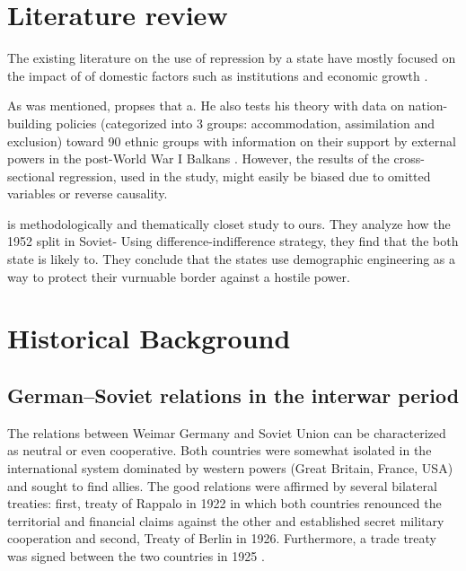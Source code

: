 \documentclass[12pt]{article}
\begin{document}






\section{Literature review}
The existing literature on the use of repression by a state have mostly focused on the impact of  of domestic factors such as institutions and economic growth \citep{davenport_state_2007, davenport_state_2007-1}.

As was mentioned, \citet{mylonas_politics_2013} propses that a. He also tests his theory with data on nation-building policies (categorized into 3 groups: accommodation, assimilation and exclusion)  toward  90 ethnic groups with information on their support by external powers in the post-World War I Balkans . However, the results of the cross-sectional regression, used in the study, might easily be biased due to omitted variables or reverse causality. 

 \citet{blaydes_state_2018} 

\citet{mcnamee_demographic_nodate} is methodologically and thematically closet study to ours. They analyze how the 1952 split in Soviet-
Using difference-indifference strategy, they find that the both state is likely to. They conclude that the states use demographic engineering as a way to protect their vurnuable border against a hostile power. 

\section{Historical Background}
\subsection{German–Soviet relations in the interwar period}
The relations between Weimar Germany and Soviet Union can be characterized as neutral or even cooperative. Both countries were somewhat isolated in the international system dominated by western powers (Great Britain, France, USA) and sought to find allies. The good relations were affirmed by several bilateral treaties: first, treaty of Rappalo in 1922 in which both countries renounced the territorial and financial claims against the other and established secret military cooperation and second, Treaty of Berlin in 1926. Furthermore, a trade treaty was signed between the two countries in 1925 \citep{morgan_political_1963}.
\end{document}
